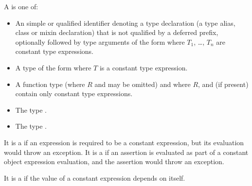 \documentclass[makeidx]{article}
\begin{document}
{\LMHash{}%
A
is one of:
\begin{itemize}
\item
  An simple or qualified identifier
  denoting a type declaration (a type alias, class or mixin declaration)
  that is not qualified by a deferred prefix,
  optionally followed by type arguments of the form
  where $T_1$, \ldots, $T_n$ are constant type expressions.
\item
  A type of the form 
  where $T$ is a constant type expression.
\item
  A function type
  (where $R$ and  may be omitted)
  and where $R$,  and 
  (if present) contain only constant type expressions.
\item
  The type \VOID.
\item
  The type \DYNAMIC.
\end{itemize}




\LMHash{}%
It is a  if an expression is required to be
a constant expression,
but its evaluation would throw an exception.
It is a  if an assertion is evaluated as part of
a constant object expression evaluation,
and the assertion would throw an exception.

\LMHash{}%
It is a  if the value of a constant expression
depends on itself.

}
\end{document}
